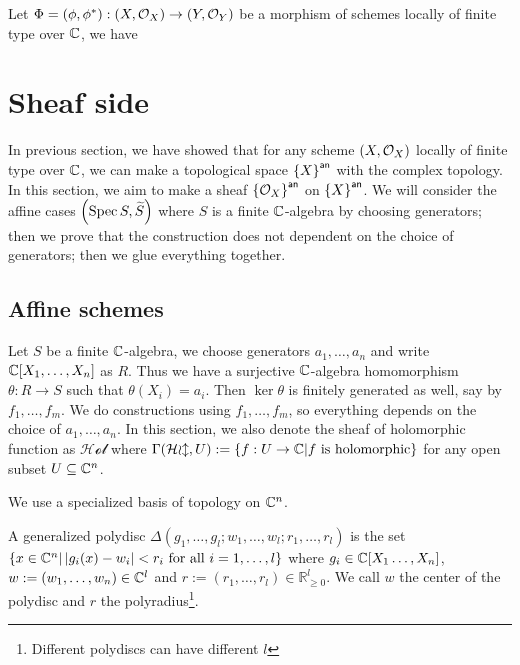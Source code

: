 \begin{corollary}
	Let $\Phi = (\phi, \phi^{*}) : \left(X, \mathcal{O}_{X}\right) \to \left(Y, \mathcal{O}_{Y}\right)$ be a morphism of schemes locally of finite type over $\mathbb{C}$, we have
	\begin{center}
	\end{center}
\end{corollary}


\section{Sheaf side}

In previous section, we have showed that for any scheme $\left(X, \mathcal{O}_{X}\right)$ locally of finite type over $\mathbb{C}$, we can make a topological space ${\left\{{X}\right\}}^{\mathsf{an}}$ with the complex topology. In this section, we aim to make a sheaf ${\left\{{\mathcal{O}_{X}}\right\}}^{\mathsf{an}}$ on ${\left\{{X}\right\}}^{\mathsf{an}}$. We will consider the affine cases $\left(\operatorname*{Spec}{S}, \widetilde{S}\right)$ where $S$ is a finite $\mathbb{C}$-algebra by choosing generators; then we prove that the construction does not dependent on the choice of generators; then we glue everything together.

\subsection{Affine schemes}
Let $S$ be a finite $\mathbb{C}$-algebra, we choose generators $a_{1},\dots, a_{n}$ and write $\mathbb{C}[X_{1},\dots,X_{n}]$ as $R$. Thus we have a surjective $\mathbb{C}$-algebra homomorphism $\theta: R \to S$ such that $\theta(X_{i}) = a_{i}$. Then $\ker\theta$ is finitely generated as well, say by $f_{1},\dots,f_{m}$. We do constructions using $f_{1},\dots, f_{m}$, so everything depends on the choice of $a_{1},\dots,a_{n}$. In this section, we also denote the sheaf of holomorphic function as $\mathcal{Hol}$ where $\Gamma(\mathcal{Hol}, U) := \{f : U \to \mathbb{C} | f~\text{is holomorphic}\}$ for any open subset $U \subseteq \mathbb{C}^{n}$.

We use a specialized basis of topology on $\mathbb{C}^{n}$.
\begin{definition}\label{def:generalized-polydisc}
	A generalized polydisc $\Delta(g_{1},\dots,g_{l}; w_{1},\dots, w_{l}; r_{1},\dots, r_{l})$ is the set $\left\{x \in \mathbb{C}^{n}| \left|g_{i}(x) - w_{i}\right| < r_{i}~\text{for all}~i = 1,\dots,l \right\}$ where $g_{i} \in \mathbb{C}[X_{1}\dots,X_{n}]$, $w := (w_{1},\dots, w_{n}) \in \mathbb{C}^{l}$ and $r := (r_{1},\dots,r_{l})\in\mathbb{R}^{l}_{\ge0}$. We call $w$ the center of the polydisc and $r$ the polyradius\footnote{Different polydiscs can have different $l$}.
\end{definition}

